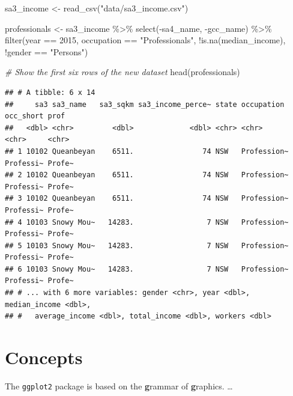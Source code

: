 \documentclass[
]{book}
\newenvironment{Shaded}{\begin{snugshade}}{\end{snugshade}}
\newcommand{\CommentTok}[1]{\textcolor[rgb]{0.56,0.35,0.01}{\textit{#1}}}
\newcommand{\DecValTok}[1]{\textcolor[rgb]{0.00,0.00,0.81}{#1}}
\newcommand{\FunctionTok}[1]{\textcolor[rgb]{0.00,0.00,0.00}{#1}}
\newcommand{\NormalTok}[1]{#1}
\newcommand{\OtherTok}[1]{\textcolor[rgb]{0.56,0.35,0.01}{#1}}
\newcommand{\SpecialCharTok}[1]{\textcolor[rgb]{0.00,0.00,0.00}{#1}}
\newcommand{\StringTok}[1]{\textcolor[rgb]{0.31,0.60,0.02}{#1}}
\begin{document}
\begin{Shaded}
\begin{Highlighting}[]
\NormalTok{sa3\_income }\OtherTok{\textless{}{-}} \FunctionTok{read\_csv}\NormalTok{(}\StringTok{"data/sa3\_income.csv"}\NormalTok{)}

\NormalTok{professionals }\OtherTok{\textless{}{-}}\NormalTok{ sa3\_income }\SpecialCharTok{\%\textgreater{}\%} 
  \FunctionTok{select}\NormalTok{(}\SpecialCharTok{{-}}\NormalTok{sa4\_name, }\SpecialCharTok{{-}}\NormalTok{gcc\_name) }\SpecialCharTok{\%\textgreater{}\%} 
  \FunctionTok{filter}\NormalTok{(year }\SpecialCharTok{==} \DecValTok{2015}\NormalTok{,}
\NormalTok{         occupation }\SpecialCharTok{==} \StringTok{"Professionals"}\NormalTok{,}
         \SpecialCharTok{!}\FunctionTok{is.na}\NormalTok{(median\_income),}
         \SpecialCharTok{!}\NormalTok{gender }\SpecialCharTok{==} \StringTok{"Persons"}\NormalTok{) }

\CommentTok{\# Show the first six rows of the new dataset}
\FunctionTok{head}\NormalTok{(professionals)}
\end{Highlighting}
\end{Shaded}

\begin{verbatim}
## # A tibble: 6 x 14
##     sa3 sa3_name   sa3_sqkm sa3_income_perce~ state occupation  occ_short prof  
##   <dbl> <chr>         <dbl>             <dbl> <chr> <chr>       <chr>     <chr> 
## 1 10102 Queanbeyan    6511.                74 NSW   Profession~ Professi~ Profe~
## 2 10102 Queanbeyan    6511.                74 NSW   Profession~ Professi~ Profe~
## 3 10102 Queanbeyan    6511.                74 NSW   Profession~ Professi~ Profe~
## 4 10103 Snowy Mou~   14283.                 7 NSW   Profession~ Professi~ Profe~
## 5 10103 Snowy Mou~   14283.                 7 NSW   Profession~ Professi~ Profe~
## 6 10103 Snowy Mou~   14283.                 7 NSW   Profession~ Professi~ Profe~
## # ... with 6 more variables: gender <chr>, year <dbl>, median_income <dbl>,
## #   average_income <dbl>, total_income <dbl>, workers <dbl>
\end{verbatim}

\hypertarget{concepts}{%
\section{Concepts}\label{concepts}}

The \texttt{ggplot2} package is based on the \textbf{g}rammar of \textbf{g}raphics. \ldots{}
\end{document}
